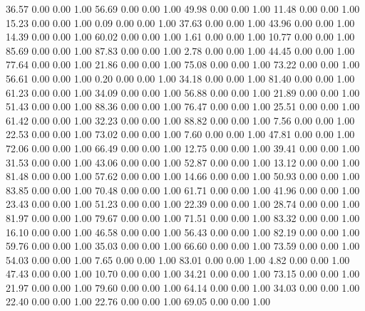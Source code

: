    36.57   0.00   0.00   1.00
   56.69   0.00   0.00   1.00
   49.98   0.00   0.00   1.00
   11.48   0.00   0.00   1.00
   15.23   0.00   0.00   1.00
    0.09   0.00   0.00   1.00
   37.63   0.00   0.00   1.00
   43.96   0.00   0.00   1.00
   14.39   0.00   0.00   1.00
   60.02   0.00   0.00   1.00
    1.61   0.00   0.00   1.00
   10.77   0.00   0.00   1.00
   85.69   0.00   0.00   1.00
   87.83   0.00   0.00   1.00
    2.78   0.00   0.00   1.00
   44.45   0.00   0.00   1.00
   77.64   0.00   0.00   1.00
   21.86   0.00   0.00   1.00
   75.08   0.00   0.00   1.00
   73.22   0.00   0.00   1.00
   56.61   0.00   0.00   1.00
    0.20   0.00   0.00   1.00
   34.18   0.00   0.00   1.00
   81.40   0.00   0.00   1.00
   61.23   0.00   0.00   1.00
   34.09   0.00   0.00   1.00
   56.88   0.00   0.00   1.00
   21.89   0.00   0.00   1.00
   51.43   0.00   0.00   1.00
   88.36   0.00   0.00   1.00
   76.47   0.00   0.00   1.00
   25.51   0.00   0.00   1.00
   61.42   0.00   0.00   1.00
   32.23   0.00   0.00   1.00
   88.82   0.00   0.00   1.00
    7.56   0.00   0.00   1.00
   22.53   0.00   0.00   1.00
   73.02   0.00   0.00   1.00
    7.60   0.00   0.00   1.00
   47.81   0.00   0.00   1.00
   72.06   0.00   0.00   1.00
   66.49   0.00   0.00   1.00
   12.75   0.00   0.00   1.00
   39.41   0.00   0.00   1.00
   31.53   0.00   0.00   1.00
   43.06   0.00   0.00   1.00
   52.87   0.00   0.00   1.00
   13.12   0.00   0.00   1.00
   81.48   0.00   0.00   1.00
   57.62   0.00   0.00   1.00
   14.66   0.00   0.00   1.00
   50.93   0.00   0.00   1.00
   83.85   0.00   0.00   1.00
   70.48   0.00   0.00   1.00
   61.71   0.00   0.00   1.00
   41.96   0.00   0.00   1.00
   23.43   0.00   0.00   1.00
   51.23   0.00   0.00   1.00
   22.39   0.00   0.00   1.00
   28.74   0.00   0.00   1.00
   81.97   0.00   0.00   1.00
   79.67   0.00   0.00   1.00
   71.51   0.00   0.00   1.00
   83.32   0.00   0.00   1.00
   16.10   0.00   0.00   1.00
   46.58   0.00   0.00   1.00
   56.43   0.00   0.00   1.00
   82.19   0.00   0.00   1.00
   59.76   0.00   0.00   1.00
   35.03   0.00   0.00   1.00
   66.60   0.00   0.00   1.00
   73.59   0.00   0.00   1.00
   54.03   0.00   0.00   1.00
    7.65   0.00   0.00   1.00
   83.01   0.00   0.00   1.00
    4.82   0.00   0.00   1.00
   47.43   0.00   0.00   1.00
   10.70   0.00   0.00   1.00
   34.21   0.00   0.00   1.00
   73.15   0.00   0.00   1.00
   21.97   0.00   0.00   1.00
   79.60   0.00   0.00   1.00
   64.14   0.00   0.00   1.00
   34.03   0.00   0.00   1.00
   22.40   0.00   0.00   1.00
   22.76   0.00   0.00   1.00
   69.05   0.00   0.00   1.00
